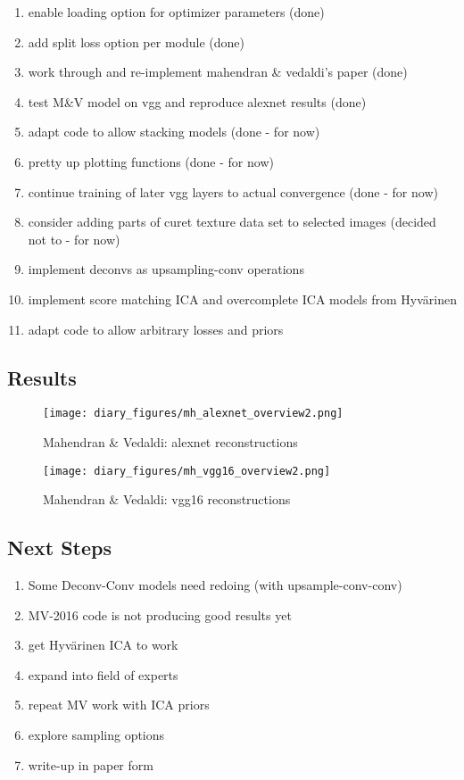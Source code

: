 \documentclass{article}
\begin{document}
\begin{enumerate}
    \item enable loading option for optimizer parameters (done)
    \item  add split loss option per module (done)
    \item  work through and re-implement mahendran \& vedaldi's paper (done)
    \item  test M\&V model on vgg and reproduce alexnet results (done)
    \item  adapt code to allow stacking models (done - for now)
    \item  pretty up plotting functions (done - for now)
    \item  continue training of later vgg layers to actual convergence (done - for now)
    \item  consider adding parts of curet texture data set to selected images (decided not to - for now)
    \item implement deconvs as upsampling-conv operations
    \item implement score matching ICA and overcomplete ICA models from Hyvärinen
    \item adapt code to allow arbitrary losses and priors
\end{enumerate}

\subsection*{Results}
\FloatBarrier
\begin{figure}
    \centering
    \texttt{[image: diary\_figures/mh\_alexnet\_overview2.png]}
    \caption{Mahendran \& Vedaldi: alexnet reconstructions}
    \label{fig:mh_alex}
\end{figure}

\begin{figure}
    \centering
    \texttt{[image: diary\_figures/mh\_vgg16\_overview2.png]}
    \caption{Mahendran \& Vedaldi: vgg16 reconstructions}
    \label{fig:mh_vgg}
\end{figure}
\FloatBarrier
\subsection*{Next Steps}
\begin{enumerate}
    \item Some Deconv-Conv models need redoing (with upsample-conv-conv)
    \item MV-2016 code is not producing good results yet
    \item get Hyvärinen ICA to work
    \item expand into field of experts
    \item repeat MV work with ICA priors
    \item explore sampling options
    \item write-up in paper form
\end{enumerate}
\end{document}
